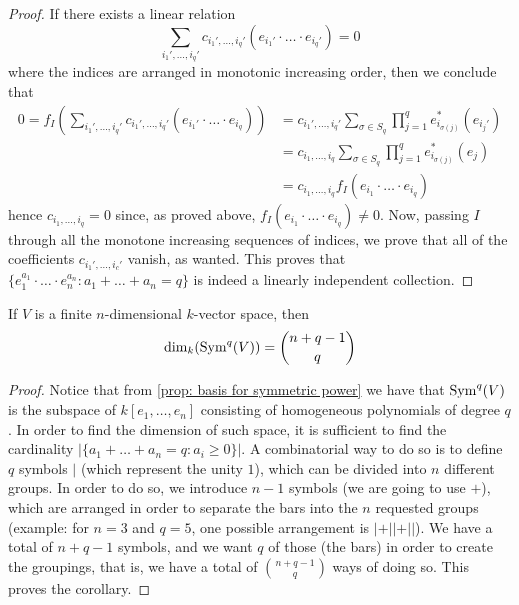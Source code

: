 \begin{proof}
If there exists a linear relation
\[
  \sum_{i_1', \dots, i_q'} c_{i_1', \dots, i_q'} (e_{i_1'} \cdot \ldots \cdot
  e_{i_q'}) = 0
\]
where the indices are arranged in monotonic increasing order, then we conclude
that
\begin{align*}
  0 = f_I \left( \sum_{i_1', \dots, i_q'} c_{i_1', \dots, i_q'} (e_{i_1'} \cdot
  \ldots \cdot e_{i_q}) \right)
  &= c_{i_1', \dots, i_q'} \sum_{\sigma \in S_q} \prod_{j=1}^q
  e_{i_{\sigma(j)}}^*(e_{i_j'}) \\
  &= c_{i_1, \dots, i_q} \sum_{\sigma \in S_q} \prod_{j=1}^q
  e_{i_{\sigma(j)}}^*(e_j) \\
  &=  c_{i_1, \dots, i_q} f_I(e_{i_1} \cdot \ldots \cdot e_{i_q})
\end{align*}
hence \(c_{i_1, \dots, i_q} = 0\) since, as proved above, \(f_I(e_{i_1} \cdot
\ldots \cdot e_{i_q}) \neq 0\). Now, passing \(I\) through all the monotone
increasing sequences of indices, we prove that all of the coefficients
\(c_{i_1', \dots, i_c'}\) vanish, as wanted. This proves that \(\{e_1^{a_1}
\cdot \ldots \cdot e_n^{a_n} \colon a_1 + \dots + a_n = q\}\) is indeed a linearly
independent collection.
\end{proof}

\begin{corollary}
If \(V\) is a finite \(n\)-dimensional \(k\)-vector space, then
\[
  \dim_k(\operatorname{Sym}^q(V)) = \binom{n + q - 1}{q}
\]
\end{corollary}

\begin{proof}
Notice that from \cref{prop: basis for symmetric power} we have that
\(\operatorname{Sym}^q(V)\) is the subspace of \(k[e_1, \dots, e_n]\) consisting of
homogeneous polynomials of degree \(q\). In order to find the dimension of
such space, it is sufficient to find the cardinality \(|\{a_1 + \dots + a_n =
q \colon a_i \geq 0\}|\). A combinatorial way to do so is to define \(q\)
symbols \(|\) (which represent the unity \(1\)), which can be divided into
\(n\) different groups. In order to do so, we introduce \(n - 1\) symbols (we
are going to use \(+\)), which are arranged in order to separate the bars into
the \(n\) requested groups (example: for \(n = 3\) and \(q = 5\), one possible
arrangement is \(| + || + ||\)). We have a total of \(n + q - 1\) symbols, and
we want \(q\) of those (the bars) in order to create the groupings, that
is, we have a total of \(\binom{n + q - 1}{q}\) ways of doing so. This proves
the corollary.
\end{proof}

